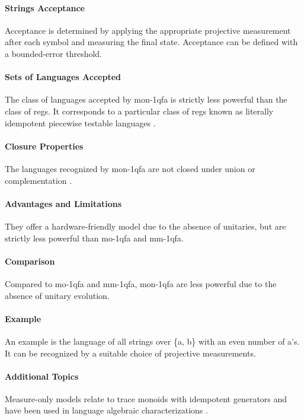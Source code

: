 \paragraph{Strings Acceptance}
Acceptance is determined by applying the appropriate projective measurement after each symbol and measuring the final state. Acceptance can be defined with a bounded-error threshold.

\paragraph{Sets of Languages Accepted}
The class of languages accepted by \gls{mon-1qfa} is strictly less powerful than the class of \glspl{reg}. It corresponds to a particular class of \glspl{reg} known as literally idempotent piecewise testable languages \cite{bertoni2010trace}.

\paragraph{Closure Properties}
The languages recognized by \gls{mon-1qfa} are not closed under union or complementation \cite{bertoni2010trace}.

\paragraph{Advantages and Limitations}
They offer a hardware-friendly model due to the absence of unitaries, but are strictly less powerful than \gls{mo-1qfa} and \gls{mm-1qfa}.

\paragraph{Comparison}
Compared to \gls{mo-1qfa} and \gls{mm-1qfa}, \gls{mon-1qfa} are less powerful due to the absence of unitary evolution.

\paragraph{Example}
An example is the language of all strings over \{a, b\} with an even number of a's. It can be recognized by a suitable choice of projective measurements.

\paragraph{Additional Topics}
Measure-only models relate to trace monoids with idempotent generators and have been used in language algebraic characterizations \cite{comin2013extended, bertoni2010trace}.

